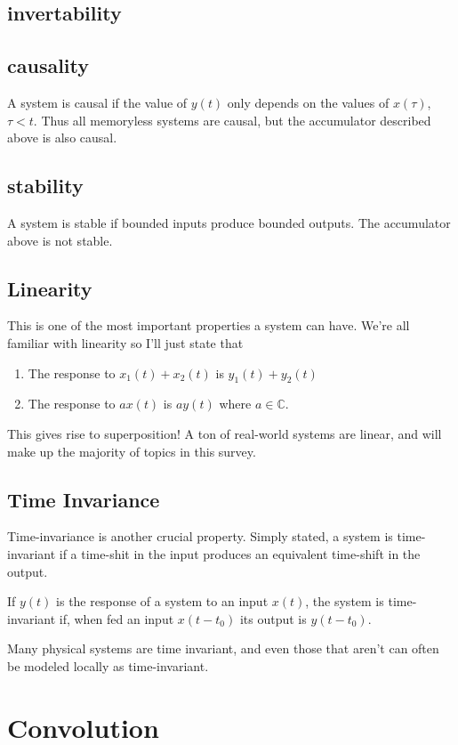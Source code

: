 \subsection{invertability}

\subsection{causality}
A system is causal if the value of $y(t)$ only depends on the values
of $x(\tau)$, $\tau < t$. Thus all memoryless systems are causal, 
but the accumulator described above is also causal. 


\subsection{ stability }
A system is stable if bounded inputs produce bounded outputs. The accumulator
above is not stable. 

\subsection{Linearity}
This is one of the most important properties a system can have. We're
all familiar with linearity so I'll just state that 
\begin{enumerate}
\item The response to $x_1(t) + x_2(t)$ is $y_1(t) + y_2(t)$
\item The response to $a x(t)$ is $a y(t)$ where $a \in \mathbb{C}$. 
\end{enumerate}

This gives rise to superposition! A ton of real-world systems are linear, 
and will make up the majority of topics in this survey. 

\subsection{Time Invariance}
Time-invariance is another crucial property. Simply stated, a
system is time-invariant if a time-shit in the input
produces an equivalent time-shift in the output. 

If $y(t)$ is the response of a system to an input $x(t)$, the system
is time-invariant if, when fed an input $x(t-t_0)$ its output is $y(t
- t_0)$.
 
Many physical systems are time invariant, and even those that aren't
can often be modeled locally as time-invariant. 


\section{Convolution}


